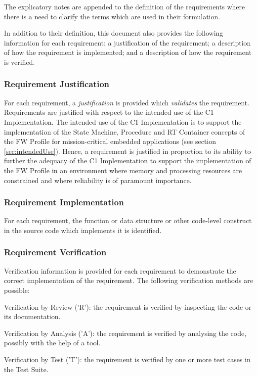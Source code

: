 \documentclass[a4paper,10pt]{article}
\newenvironment{fw_itemize}						%
{\begin{itemize}
  \setlength{\itemsep}{1mm}
  \setlength{\parskip}{0pt}
  \setlength{\parsep}{0pt}}
{\end{itemize}}
\begin{document}
The explicatory notes are appended to the definition of the requirements where there is a need to clarify the terms which are used in their formulation.

In addition to their definition, this document also provides the following information for each requirement: a justification of the requirement; a description of how the requirement is implemented; and a description of how the requirement is verified. 

\subsubsection{Requirement Justification}
For each requirement, a \emph{justification} is provided which \emph{validates} the requirement. Requirements are justified with respect to the intended use of the C1 Implementation. The intended use of the C1 Implementation is to support the implementation of the State Machine, Procedure and RT Container concepts of the FW Profile for mission-critical embedded applications (see section \ref{sec:intendedUse}).  Hence, a requirement is justified in proportion to its ability to further the adequacy of the C1 Implementation to support the implementation of the FW Profile in an environment where memory and processing resources are constrained and where reliability is of paramount importance. 

\subsubsection{Requirement Implementation}
For each requirement, the function or data structure or other code-level construct in the source code which implements it is identified.

\subsubsection{Requirement Verification}\label{sec:reqVer}
Verification information is provided for each requirement to demonstrate the correct implementation of the requirement. The following verification methods are possible:

\begin{fw_itemize}
\item Verification by Review ('R'): the requirement is verified by inspecting the code or its documentation.
\item Verification by Analysis ('A'): the requirement is verified by analysing the code, possibly with the help of a tool.
\item Verification by Test ('T'): the requirement is verified by one or more test cases in the Test Suite.
\end{fw_itemize}
\end{document}
